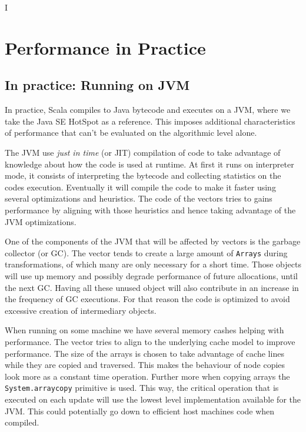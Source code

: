 I%

\chapter{ Performance in Practice} %

\label{Performance} %



\section{In practice: Running on JVM}
\label{InPractice}

In practice, Scala compiles to Java bytecode and executes on a JVM, where we take the Java SE HotSpot as a reference. This imposes additional characteristics of performance that can't be evaluated on the algorithmic level alone.

The JVM use \emph{just in time} (or JIT) compilation of code to take advantage of knowledge about how the code is used at runtime. At first it runs on interpreter mode, it consists of interpreting the bytecode and collecting statistics on the codes execution. Eventually it will compile the code to make it faster using several optimizations and heuristics. The code of the vectors tries to gains performance by aligning with those heuristics and hence taking advantage of the JVM optimizations.

One of the components of the JVM that will be affected by vectors is the garbage collector (or GC). The vector tends to create a large amount of \texttt{Arrays} during transformations, of which many are only necessary for a short time. Those objects will use up memory and possibly degrade performance of future allocations, until the next GC. Having all these unused object will also contribute in an increase in the frequency of GC executions. For that reason the code is optimized to avoid excessive creation of intermediary objects.

When running on some machine we have several memory cashes helping with performance. The vector tries to align to the underlying cache model to improve performance. The size of the arrays is chosen to take advantage of cache lines while they are copied and traversed. This makes the behaviour of node copies look more as a constant time operation. Further more when copying arrays the \texttt{System.arraycopy} primitive is used. This way, the critical operation that is executed on each update will use the lowest level implementation available for the JVM. This could potentially go down to efficient host machines code when compiled.

